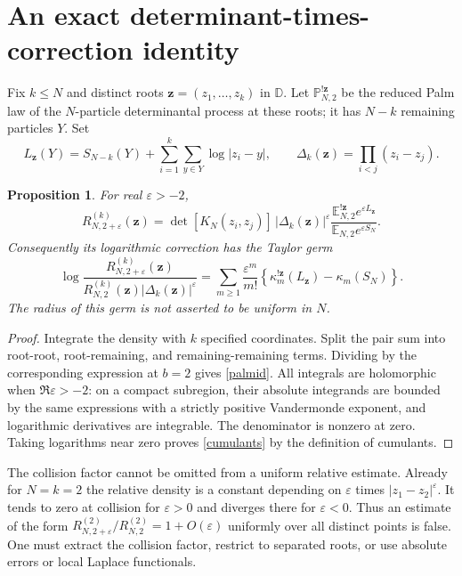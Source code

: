 \documentclass[11pt]{article}
\newtheorem{proposition}[theorem]{Proposition}
\theoremstyle{remark}\newtheorem{remark}[theorem]{Remark}
\newcommand{\D}{\mathbb D}
\newcommand{\E}{\mathbb E}
\newcommand{\Pp}{\mathbb P}
\begin{document}
\section{An exact determinant-times-correction identity}
Fix $k\le N$ and distinct roots $\mathbf z=(z_1,\ldots,z_k)$ in $\D$.
Let $\Pp_{N,2}^{!\mathbf z}$ be the reduced Palm law of the $N$-particle
determinantal process at these roots; it has $N-k$ remaining particles $Y$.
Set
\[
 L_{\mathbf z}(Y)=S_{N-k}(Y)+\sum_{i=1}^k\sum_{y\in Y}\log|z_i-y|,
 \qquad \Delta_k(\mathbf z)=\prod_{i<j}(z_i-z_j).
\]
\begin{proposition}\label{palm}
For real $\varepsilon>-2$,
\begin{equation}\label{palmid}
 R_{N,2+\varepsilon}^{(k)}(\mathbf z)
 =\det[K_N(z_i,z_j)]\,|\Delta_k(\mathbf z)|^\varepsilon
 \frac{\E_{N,2}^{!\mathbf z}e^{\varepsilon L_{\mathbf z}}}
 {\E_{N,2}e^{\varepsilon S_N}}.
\end{equation}
Consequently its logarithmic correction has the Taylor germ
\begin{equation}\label{cumulants}
 \log\frac{R_{N,2+\varepsilon}^{(k)}(\mathbf z)}
 {R_{N,2}^{(k)}(\mathbf z)|\Delta_k(\mathbf z)|^\varepsilon}
 =\sum_{m\ge1}\frac{\varepsilon^m}{m!}
 \left\{\kappa_m^{!\mathbf z}(L_{\mathbf z})-\kappa_m(S_N)\right\}.
\end{equation}
The radius of this germ is not asserted to be uniform in $N$.
\end{proposition}
\begin{proof}
Integrate the density with $k$ specified coordinates. Split the pair sum
into root-root, root-remaining, and remaining-remaining terms. Dividing by
the corresponding expression at $b=2$ gives \eqref{palmid}. All integrals
are holomorphic when $\Re\varepsilon>-2$: on a compact subregion, their
absolute integrands are bounded by the same expressions with a strictly
positive Vandermonde exponent, and logarithmic derivatives are integrable.
The denominator is nonzero at zero. Taking logarithms near zero proves
\eqref{cumulants} by the definition of cumulants.
\end{proof}

The collision factor cannot be omitted from a uniform relative estimate.
Already for $N=k=2$ the relative density is a constant depending on
$\varepsilon$ times $|z_1-z_2|^\varepsilon$. It tends to zero at collision
for $\varepsilon>0$ and diverges there for $\varepsilon<0$. Thus an estimate
of the form $R_{N,2+\varepsilon}^{(2)}/R_{N,2}^{(2)}=1+O(\varepsilon)$
uniformly over all distinct points is false. One must extract the collision
factor, restrict to separated roots, or use absolute errors or local Laplace
functionals.
\end{document}
